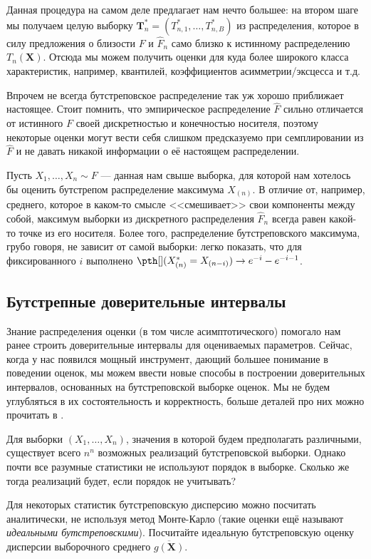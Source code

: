 Данная процедура на самом деле предлагает нам нечто большее: на втором шаге мы получаем целую выборку $\mathbf T_n^* = (T_{n,1}^*, \ldots, T_{n,B}^*)$ из распределения, которое в силу предложения о близости $F$ и $\widehat F_n$ само близко к истинному распределению $T_n(\mathbf X)$. Отсюда мы можем получить оценки для куда более широкого класса характеристик, например, квантилей, коэффициентов асимметрии/эксцесса и т.д.

Впрочем не всегда бутстреповское распределение так уж хорошо приближает настоящее. Стоит помнить, что эмпирическое распределение $\widehat F$ сильно отличается от истинного $F$ своей дискретностью и конечностью носителя, поэтому некоторые оценки могут вести себя слишком предсказуемо при семплировании из $\widehat F$ и не давать никакой информации о её настоящем распределении.

\begin{example}
	Пусть $X_1, \ldots, X_n \sim F$ --- данная нам свыше выборка, для которой нам хотелось бы оценить бутстрепом распределение максимума $X_{(n)}$. В отличие от, например, среднего, которое в каком-то смысле <<смешивает>> свои компоненты между собой, максимум выборки из дискретного распределения $\widehat F_n$ всегда равен какой-то точке из его носителя. Более того, распределение бутстреповского максимума, грубо говоря, не зависит от самой выборки: легко показать, что для фиксированного $i$ выполнено $\pth[](X_{(n)}^{*} = X_{(n-i)}) \to e^{-i} - e^{-i-1}$.
\end{example}

\subsection{Бутстрепные доверительные интервалы}

Знание распределения оценки (в том числе асимптотического) помогало нам ранее строить доверительные интервалы для оцениваемых параметров. Сейчас, когда у нас появился мощный инструмент, дающий большее понимание в поведении оценок, мы можем ввести новые способы в построении доверительных интервалов, основанных на бутстреповской выборке оценок. Мы не будем углубляться в их состоятельность и корректность, больше деталей про них можно прочитать в \cite{tibshirani1993introduction}.



\begin{problem}
	Для выборки $(X_1, \ldots, X_n)$, значения в которой будем предполагать различными, существует всего $n^n$ возможных реализаций бутстреповской выборки. Однако почти все разумные статистики не используют порядок в выборке. Сколько же тогда реализаций будет, если порядок не учитывать?
\end{problem}

\begin{problem}
	Для некоторых статистик бутстреповскую дисперсию можно посчитать аналитически, не используя метод Монте-Карло (такие оценки ещё называют \textit{идеальными бутстреповскими}). Посчитайте идеальную бутстреповскую оценку дисперсии выборочного среднего $\overline{g(\mathbf X)}$.
\end{problem}


